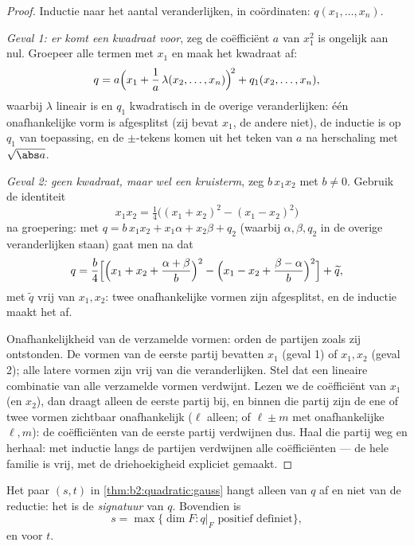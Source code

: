 \begin{proof}
Inductie naar het aantal veranderlijken, in coördinaten: $q(x_1,
\dots, x_n)$.

\emph{Geval 1: er komt een kwadraat voor}, zeg de coëfficiënt $a$
van $x_1^2$ is ongelijk aan nul. Groepeer alle termen met $x_1$ en
maak het kwadraat af:
\[
q = a\Bigl(x_1 + \frac{1}{a}\,\lambda(x_2, \dots,
x_n)\Bigr)^{\!2} + q_1(x_2, \dots, x_n),
\]
waarbij $\lambda$ lineair is en $q_1$ kwadratisch in de overige
veranderlijken: één onafhankelijke vorm is afgesplitst (zij bevat
$x_1$, de andere niet), de inductie is op $q_1$ van toepassing, en
de $\pm$-tekens komen uit het teken van $a$ na herschaling met
$\sqrt{\abs a}$.

\emph{Geval 2: geen kwadraat, maar wel een kruisterm}, zeg
$b\,x_1x_2$ met $b \neq 0$. Gebruik de identiteit
\[
x_1x_2 = \tfrac14\bigl((x_1 + x_2)^2 - (x_1 - x_2)^2\bigr)
\]
na groepering: met $q = b\,x_1x_2 + x_1\alpha + x_2\beta + q_2$
(waarbij $\alpha, \beta, q_2$ in de overige veranderlijken staan)
gaat men na dat
\[
q = \frac{b}{4}\Bigl[\Bigl(x_1 + x_2 + \frac{\alpha +
\beta}{b}\Bigr)^{2} - \Bigl(x_1 - x_2 + \frac{\beta -
\alpha}{b}\Bigr)^{2}\Bigr] + \widetilde q ,
\]
met $\widetilde q$ vrij van $x_1, x_2$: twee onafhankelijke vormen
zijn afgesplitst, en de inductie maakt het af.

Onafhankelijkheid van de verzamelde vormen: orden de partijen zoals
zij ontstonden. De vormen van de eerste partij bevatten $x_1$
(geval 1) of $x_1, x_2$ (geval 2); alle latere vormen zijn vrij van
die veranderlijken. Stel dat een lineaire combinatie van alle
verzamelde vormen verdwijnt. Lezen we de coëfficiënt van $x_1$ (en
$x_2$), dan draagt alleen de eerste partij bij, en binnen die
partij zijn de ene of twee vormen zichtbaar onafhankelijk ($\ell$
alleen; of $\ell \pm m$ met onafhankelijke $\ell, m$): de
coëfficiënten van de eerste partij verdwijnen dus. Haal die partij
weg en herhaal: met inductie langs de partijen verdwijnen alle
coëfficiënten --- de hele familie is vrij, met de driehoekigheid
expliciet gemaakt.
\end{proof}

\begin{theorem}\label{thm:b2:quadratic:sylvester}
Het paar $(s, t)$ in \cref{thm:b2:quadratic:gauss} hangt alleen van
$q$ af en niet van de reductie: het is de
\emph{signatuur} van
$q$. Bovendien is
\[
s = \max\{\dim F : q|_F \text{ positief definiet}\},
\]
en  voor $t$.
\end{theorem}

